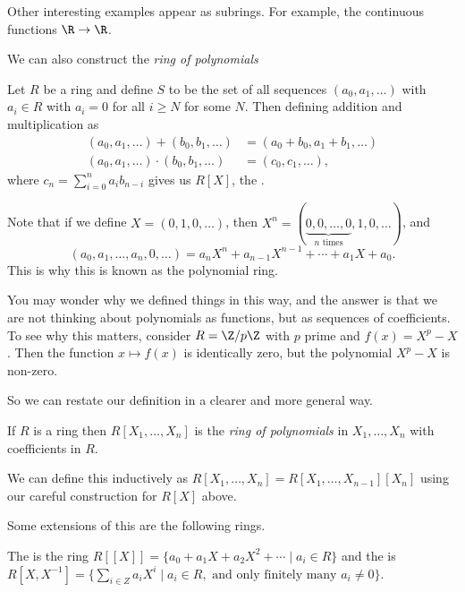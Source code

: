  Other interesting examples appear as subrings. For example, the continuous functions $\R \rightarrow \R$.

 We can also construct the \emph{ring of polynomials} 

\begin{definition}
	Let $R$ be a ring and define $S$ to be  the set of all sequences $(a_0, a_1, \dots)$ with $a_i \in R$ with $a_i = 0$ for all $i \geq N$ for some $N$. Then defining addition and multiplication as
		 \begin{align*}
			 (a_0, a_1, \dots) + (b_0, b_1, \dots) &= (a_0 + b_0, a_1 + b_1, \dots) \\
			 (a_0, a_1, \dots) \cdot (b_0, b_1, \dots) &= (c_0, c_1, \dots),
		 \end{align*}
		 where $c_n = \sum_{i = 0}^n a_i b_{n - i}$ gives us $R[X]$, the .
\end{definition}

Note that if we define $X = (0, 1, 0, \dots)$, then $X^n = (\underbrace{0, 0, \dots, 0}_{\text{$n$ times}}, 1, 0, \dots)$, and
$$
(a_0, a_1, \dots, a_n, 0, \dots) = a_n X^n + a_{n - 1}X^{n - 1} + \cdots + a_1 X + a_0.
$$
This is why this is known as the polynomial ring.

You may wonder why we defined things in this way, and the answer is that we are not thinking about polynomials as functions, but as sequences of coefficients. To see why this matters, consider $R = \Z/p\Z$ with $p$ prime and $f(x) = X^p - X$. Then the function $x \mapsto f(x)$ is identically zero, but the polynomial $X^p - X$ is non-zero.

So we can restate our definition in a clearer and more general way.

\begin{definition}
	If $R$ is a ring then $R[X_1, \dots, X_n]$ is the \emph{ring of polynomials} in $X_1, \dots, X_n$ with coefficients in $R$.
\end{definition}

\begin{remark}
We can define this inductively as $R[X_1, \dots, X_n] = R[X_1, \dots, X_{n - 1}][X_n]$ using our careful construction for $R[X]$ above.
\end{remark}

Some extensions of this are the following rings.

\begin{definition}
	The  is the ring $R[[X]] = \{a_0 + a_1 X + a_2X^2 + \cdots \mid a_i \in R\}$ and the  is $R[X, X^{-1}] = \{\sum_{i \in Z}a_iX^{i} \mid a_i \in R, \text{ and only finitely many $a_i \neq 0$}\}$.
\end{definition}

